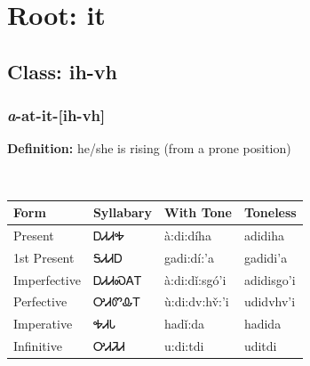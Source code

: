 \needspace{4in}
\section*{Root: it}
\nopagebreak
{}
\needspace{3in}
\subsection*{Class: ih-vh}
\nopagebreak
\needspace{2in}
\subsubsection*{\textit{a}{-}at{-}\textbf{it}{-}[ih-vh]}
\nopagebreak
\textbf{Definition: } he/she is rising (from a prone position)
\\[0.5em]
\begin{tabularx}{\textwidth}{l X X X}%
\toprule%
\textbf{Form}&\textbf{Syllabary}&\textbf{With Tone}&\textbf{Toneless}\\%
\midrule%
Present&ᎠᏗᏗᎭ&à:di:díha&adidiha\\%
1st Present&ᎦᏗᏗᎠ&gadi:dí:’a&gadidi’a\\%
Imperfective&ᎠᏗᏗᏍᎪᎢ&à:di:dǐ:sgó’i&adidisgo’i\\%
Perfective&ᎤᏗᏛᎲᎢ&ù:di:dv:hv̌:’i&udidvhv’i\\%
Imperative&ᎭᏗᏓ&hadǐ:da&hadida\\%
Infinitive&ᎤᏗᏘᏗ&u:di:tdi&uditdi\\%
\bottomrule%
\end{tabularx}
\\[1em]